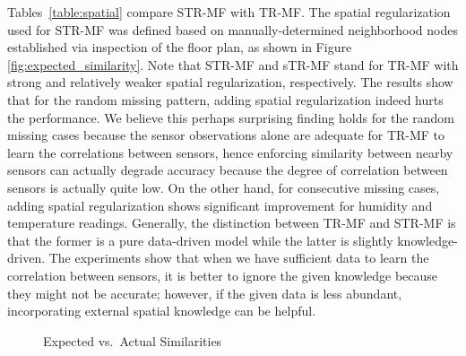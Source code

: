 Tables~\ref{table:spatial} compare STR-MF with TR-MF.
The spatial regularization used for STR-MF was defined based on manually-determined neighborhood nodes established via inspection of the floor plan, as shown in Figure \ref{fig:expected_similarity}.
Note that STR-MF and sTR-MF stand for TR-MF with strong and relatively weaker spatial regularization, respectively.
The results show that for the random missing pattern, adding spatial regularization indeed hurts the performance.
We believe this perhaps surprising finding holds for the random missing cases because the sensor observations alone are adequate for TR-MF to learn the correlations between sensors, hence enforcing similarity between nearby sensors can actually degrade accuracy because the degree of correlation between sensors is actually quite low.
On the other hand, for consecutive missing cases, adding spatial regularization shows significant improvement for humidity and temperature readings.
Generally, the distinction between TR-MF and STR-MF is that the former is a pure data-driven model while the latter is slightly knowledge-driven.
The experiments show that when we have sufficient data to learn the correlation between sensors, it is better to ignore the given knowledge because they might not be accurate; however, if the given data is less abundant, incorporating external spatial knowledge can be helpful.


\begin{figure}[h]
\centering
\vspace{-0.4cm}
\hspace{-0.4cm}
\hspace{-0.4cm}
\vspace{-0.3cm}
\caption{Expected vs.~Actual Similarities}
\label{fig:similarity}
\vspace{-0.3cm}
\end{figure}


